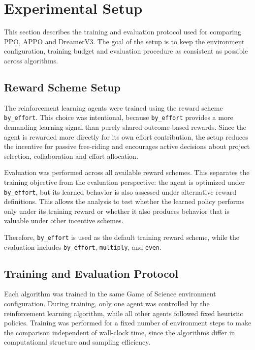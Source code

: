 \documentclass[english,bachelor]{hsluthesis}
\begin{document}
\section{Experimental Setup}

This section describes the training and evaluation protocol used for comparing PPO, APPO and DreamerV3. The goal of the setup is to keep the environment configuration, training budget and evaluation procedure as consistent as possible across algorithms.

\subsection{Reward Scheme Setup}

The reinforcement learning agents were trained using the reward scheme \texttt{by\_effort}. This choice was intentional, because \texttt{by\_effort} provides a more demanding learning signal than purely shared outcome-based rewards. Since the agent is rewarded more directly for its own effort contribution, the setup reduces the incentive for passive free-riding and encourages active decisions about project selection, collaboration and effort allocation.

Evaluation was performed across all available reward schemes. This separates the training objective from the evaluation perspective: the agent is optimized under \texttt{by\_effort}, but its learned behavior is also assessed under alternative reward definitions. This allows the analysis to test whether the learned policy performs only under its training reward or whether it also produces behavior that is valuable under other incentive schemes.

Therefore, \texttt{by\_effort} is used as the default training reward scheme, while the evaluation includes \texttt{by\_effort}, \texttt{multiply}, and \texttt{even}.

\subsection{Training and Evaluation Protocol}

Each algorithm was trained in the same Game of Science environment configuration. During training, only one agent was controlled by the reinforcement learning algorithm, while all other agents followed fixed heuristic policies. Training was performed for a fixed number of environment steps to make the comparison independent of wall-clock time, since the algorithms differ in computational structure and sampling efficiency.
\end{document}
